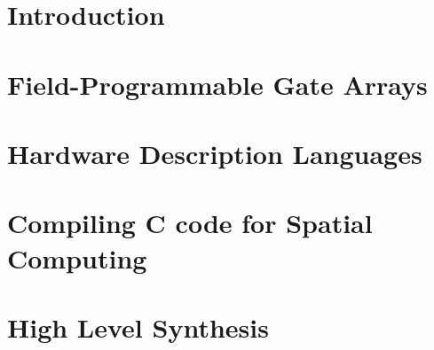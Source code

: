 \section{Introduction}
\label{reconfigurableComputing:introduction}


\section{Field-Programmable Gate Arrays}
\label{fpga}


\section{Hardware Description Languages}
\label{hdl}


\section{Compiling C code for Spatial Computing}
\label{cForSpatial}


\section{High Level Synthesis}
\label{hls}

